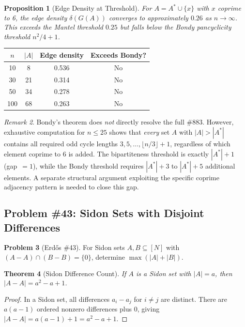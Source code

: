 \documentclass[11pt,a4paper]{article}
\newtheorem{theorem}{Theorem}[section]
\newtheorem{proposition}[theorem]{Proposition}
\theoremstyle{definition}
\newtheorem{problem}[theorem]{Problem}
\theoremstyle{remark}
\newtheorem{remark}[theorem]{Remark}
\begin{document}
\begin{proposition}[Edge Density at Threshold]\label{prop:density-limit}
For $A = A^* \cup \{x\}$ with $x$ coprime to 6, the edge density
$\delta(G(A))$ converges to approximately $0.26$ as $n \to \infty$.
This exceeds the Mantel threshold $0.25$ but falls below the Bondy
pancyclicity threshold $n^2/4 + 1$.
\end{proposition}

\begin{center}
\begin{tabular}{cccc}
\toprule
$n$ & $|A|$ & Edge density & Exceeds Bondy? \\
\midrule
10 & 8 & 0.536 & No \\
30 & 21 & 0.314 & No \\
50 & 34 & 0.278 & No \\
100 & 68 & 0.263 & No \\
\bottomrule
\end{tabular}
\end{center}

\begin{remark}
Bondy's theorem does \emph{not} directly resolve the full \#883. However,
exhaustive computation for $n \leq 25$ shows that \emph{every} set $A$
with $|A| > |A^*|$ contains all required odd cycle lengths $3, 5, \ldots,
\lfloor n/3 \rfloor + 1$, regardless of which element coprime to 6 is added.
The bipartiteness threshold is exactly $|A^*|+1$ (gap~$=1$), while the Bondy
threshold requires $|A^*|+3$ to $|A^*|+5$ additional elements.
A separate structural argument exploiting the specific coprime adjacency pattern
is needed to close this gap.
\end{remark}

\subsection{Problem \#43: Sidon Sets with Disjoint Differences}

\begin{problem}[Erd\H{o}s \#43]
For Sidon sets $A, B \subseteq [N]$ with $(A-A) \cap (B-B) = \{0\}$,
determine $\max(|A| + |B|)$.
\end{problem}

\begin{theorem}[Sidon Difference Count]\label{thm:sidon-diff}
If $A$ is a Sidon set with $|A| = a$, then $|A - A| = a^2 - a + 1$.
\end{theorem}

\begin{proof}
In a Sidon set, all differences $a_i - a_j$ for $i \neq j$ are distinct.
There are $a(a-1)$ ordered nonzero differences plus 0, giving
$|A-A| = a(a-1) + 1 = a^2 - a + 1$.
\end{proof}
\end{document}
